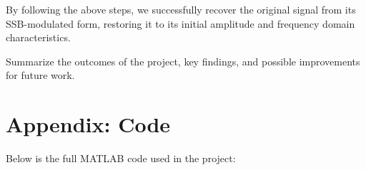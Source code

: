 \documentclass[12pt,a4paper]{article}
\begin{document}
By following the above steps, we successfully recover the original signal from its SSB-modulated form, restoring it to its initial amplitude and frequency domain characteristics.

Summarize the outcomes of the project, key findings, and possible improvements for future work.

\newpage
\section*{Appendix: Code}
Below is the full MATLAB code used in the project:






\newpage
\end{document}
